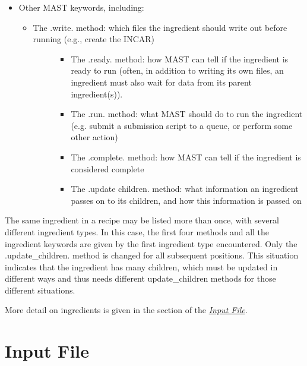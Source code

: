 \documentclass[letterpaper,10pt,english]{sphinxmanual}
\begin{document}
\begin{itemize}
\begin{itemize}
\end{itemize}

\item {} 
Other MAST keywords, including:
\begin{itemize}
\item {} \begin{description}
\item[{The .write. method: which files the ingredient should write out before running (e.g., create the INCAR)}] \leavevmode\begin{itemize}
\item {} 
The .ready. method: how MAST can tell if the ingredient is ready to run (often, in addition to writing its own files, an ingredient must also wait for data from its parent ingredient(s)).

\item {} 
The .run. method: what MAST should do to run the ingredient (e.g. submit a submission script to a queue, or perform some other action)

\item {} 
The .complete. method: how MAST can tell if the ingredient is considered complete

\item {} 
The .update children. method: what information an ingredient passes on to its children, and how this information is passed on

\end{itemize}

\end{description}

\end{itemize}

\end{itemize}

The same ingredient in a recipe may be listed more than once, with several different ingredient types. In this case, the first four methods and all the ingredient keywords are given by the first ingredient type encountered. Only the .update\_children. method is changed for all subsequent positions. This situation indicates that the ingredient has many children, which must be updated in different ways and thus needs different update\_children methods for those different situations.

More detail on ingredients is given in the  section of the {\hyperref[3_0_inputfile::doc]{\emph{Input File}}}.


\chapter{Input File}
\label{3_0_inputfile::doc}\label{3_0_inputfile:input-file}
\end{document}
